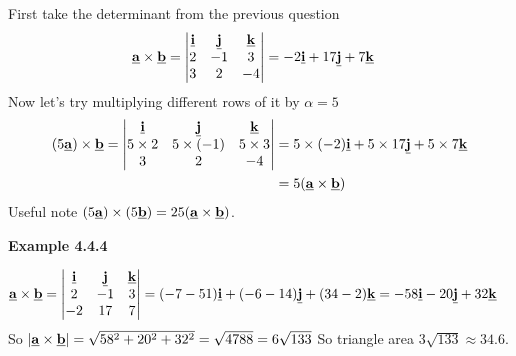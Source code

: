 First take the determinant from the previous question
\begin{align*}
\underline{\mathbf{a}}\times\underline{\mathbf{b}} = \begin{vmatrix}
    \underline{\mathbf{i}} & \underline{\mathbf{j}} & \underline{\mathbf{k}}\\
    2 & -1 & 3\\
    3 & 2 & -4
\end{vmatrix} &= -2\underline{\mathbf{i}} + 17\underline{\mathbf{j}} + 7\underline{\mathbf{k}}
\end{align*}
Now let's try multiplying different rows of it by $\alpha = 5$
\begin{align*}
(5\underline{\mathbf{a}})\times\underline{\mathbf{b}} = \begin{vmatrix}
    \underline{\mathbf{i}} & \underline{\mathbf{j}} & \underline{\mathbf{k}}\\
    5\times2 & 5\times(-1) & 5\times3\\
    3 & 2 & -4
\end{vmatrix} &= 5\times(-2)\underline{\mathbf{i}} + 5\times17\underline{\mathbf{j}} + 5\times7\underline{\mathbf{k}} \\
&= 5 (\underline{\mathbf{a}}\times\underline{\mathbf{b}}) 
\end{align*}
Useful note $(5\underline{\mathbf{a}})\times (5\underline{\mathbf{b}}) = 25(\underline{\mathbf{a}}\times\underline{\mathbf{b}})$.

\textbf{Example 4.4.4} \par

\begin{align*}
\underline{\mathbf{a}}\times\underline{\mathbf{b}} = \begin{vmatrix}
    \underline{\mathbf{i}} & \underline{\mathbf{j}} & \underline{\mathbf{k}}\\
    2 & -1 & 3\\
    -2 & 17 & 7
\end{vmatrix} &= (-7-51)\underline{\mathbf{i}} + (-6-14)\underline{\mathbf{j}} + (34-2)\underline{\mathbf{k}} = -58\underline{\mathbf{i}} -20\underline{\mathbf{j}} + 32\underline{\mathbf{k}}
\end{align*}
So $|\underline{\mathbf{a}}\times\underline{\mathbf{b}}| = \sqrt{58^2+20^2+32^2} = \sqrt{4788} = 6\sqrt{133}$
So triangle area $3\sqrt{133} \approx 34.6$.